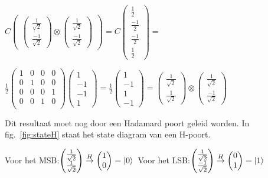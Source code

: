 \documentclass[../../main.tex]{subfiles}
\begin{document}
$
C\begin{pmatrix}
\begin{pmatrix} \tfrac{1}{\sqrt{2}}  \\ \tfrac{-1}{\sqrt{2}} \end{pmatrix}
\otimes
\begin{pmatrix} \tfrac{1}{\sqrt{2}}  \\ \tfrac{-1}{\sqrt{2}} \end{pmatrix}
\end{pmatrix}
=
C
\begin{pmatrix}
\tfrac{1}{2}\\
\tfrac{-1}{2}\\
\tfrac{-1}{2}\\
\tfrac{1}{2}
\end{pmatrix}
=
$

$
\tfrac{1}{2}
\begin{pmatrix}
1&0&0&0\\
0&1&0&0\\
0&0&0&1\\
0&0&1&0\\
\end{pmatrix}
\begin{pmatrix}
1\\
-1\\
-1\\
1
\end{pmatrix}
=
\tfrac{1}{2}
\begin{pmatrix}
1\\
-1\\
1\\
-1
\end{pmatrix}
=
\begin{pmatrix} \tfrac{1}{\sqrt{2}}  \\ \tfrac{1}{\sqrt{2}} \end{pmatrix}
\otimes
\begin{pmatrix} \tfrac{1}{\sqrt{2}}  \\ \tfrac{-1}{\sqrt{2}} \end{pmatrix}
$

Dit resultaat moet nog door een Hadamard poort geleid worden. In fig.~\ref{fig:stateH} staat het state diagram van een H-poort.

Voor het MSB:$
\begin{pmatrix} \tfrac{1}{\sqrt{2}}  \\ \tfrac{1}{\sqrt{2}} \end{pmatrix}
\overset{H}{\rightarrow}
\begin{pmatrix} 1  \\ 0 \end{pmatrix}=\ket{0}\\
$
Voor het LSB:$\begin{pmatrix} \tfrac{1}{\sqrt{2}}  \\ \tfrac{-1}{\sqrt{2}} \end{pmatrix}
\overset{H}{\rightarrow}
\begin{pmatrix} 0  \\ 1 \end{pmatrix}=\ket{1}
$
\end{document}
